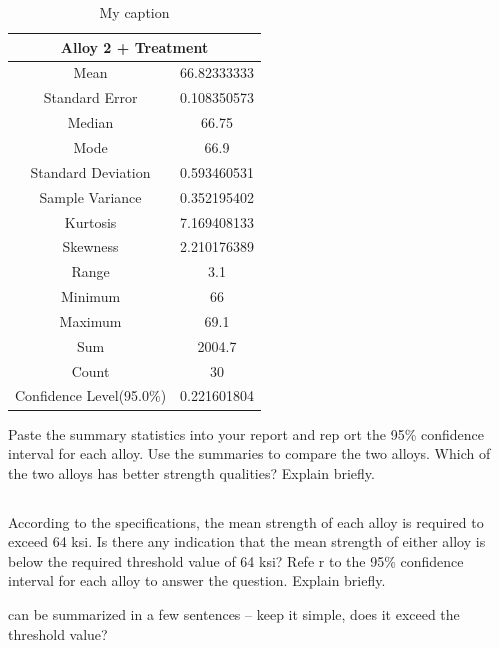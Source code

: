\documentclass[letterpaper]{article}
\begin{document}
\begin{table}[H]
 \centering
 \begin{tabular}{|c|c|}
  \hline
  \multicolumn{2}{|c|}{Alloy 2 + Treatment} \\ \hline
  Mean                     & 66.82333333    \\ \hline
  Standard Error           & 0.108350573    \\ \hline
  Median                   & 66.75          \\ \hline
  Mode                     & 66.9           \\ \hline
  Standard Deviation       & 0.593460531    \\ \hline
  Sample Variance          & 0.352195402    \\ \hline
  Kurtosis                 & 7.169408133    \\ \hline
  Skewness                 & 2.210176389    \\ \hline
  Range                    & 3.1            \\ \hline
  Minimum                  & 66             \\ \hline
  Maximum                  & 69.1           \\ \hline
  Sum                      & 2004.7         \\ \hline
  Count                    & 30             \\ \hline
  Confidence Level(95.0\%) & 0.221601804    \\ \hline
 \end{tabular}
 \caption{My caption}
 \label{3a3}
\end{table}

Paste the summary statistics into your report and rep ort the 95\% confidence
interval for each alloy. Use the summaries to compare the two alloys. Which of
the two alloys has better strength qualities? Explain briefly.

\subsection{}%
According to the specifications, the mean strength of each alloy is required to
exceed 64 ksi. Is there any indication that the mean strength of either alloy is
below the required threshold value of 64 ksi? Refe r to the 95\% confidence
interval for each alloy to answer the question. Explain briefly.

can be summarized in a few sentences -- keep it simple, does it exceed the
threshold value?
\end{document}
